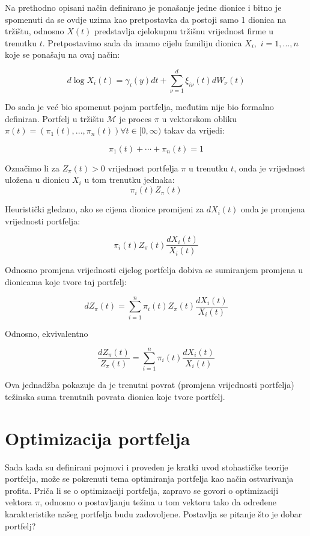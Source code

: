 \documentclass[times, utf8, seminar]{fer}
\begin{document}
Na prethodno opisani način definirano je ponašanje jedne dionice i bitno je spomenuti da se ovdje uzima kao pretpostavka da postoji samo 1 dionica na tržištu, odnosno \(X(t)\) predstavlja cjelokupnu tržišnu vrijednost firme u trenutku $t$.
Pretpostavimo sada da imamo cijelu familiju dionica \(X_i,\) \(i = 1,...,n\) koje  se ponašaju na ovaj način:

\[ d \log X_i(t) = \gamma_i(y)dt + \sum_{\nu=1}^{d}\xi_{i\nu}(t)dW_{\nu}(t) \]

Do sada je već bio spomenut pojam portfelja, međutim nije bio formalno definiran. Portfelj u tržištu $\mathcal{M}$ je proces $\pi$ u vektorskom obliku \( \pi(t) = (\pi_1(t),...,\pi_n(t)) \forall t\in [0,\infty) \) takav da vrijedi:

    \[ \pi_1(t) + \cdots + \pi_n(t) = 1 \]

Označimo li za $Z_{\pi}(t) > 0$ vrijednost portfelja $\pi$ u trenutku $t$, onda je vrijednost uložena u dionicu $X_i$ u tom trenutku jednaka:
    \[ \pi_i(t)Z_{\pi}(t) \]

Heuristički gledano, ako se cijena dionice promijeni za $dX_i(t)$ onda je promjena vrijednosti portfelja:

    \[ \pi_i(t)Z_{\pi}(t)\frac{dX_i(t)}{X_i(t)} \]

Odnosno promjena vrijednosti cijelog portfelja dobiva se sumiranjem promjena u dionicama koje tvore taj portfelj:

    \[ dZ_{\pi}(t) = \sum_{i=1}^{n} \pi_i(t)Z_{\pi}(t)\frac{dX_i(t)}{X_i(t)} \]

Odnosno, ekvivalentno

    \[ \frac{dZ_{\pi}(t)}{Z_{\pi}(t)} = \sum_{i=1}^{n} \pi_i(t)\frac{dX_i(t)}{X_i(t)} \]

Ova jednadžba pokazuje da je trenutni povrat (promjena vrijednosti portfelja) težinska suma trenutnih povrata dionica koje tvore portfelj.

\section{Optimizacija portfelja}
Sada kada su definirani pojmovi i proveden je kratki uvod stohastičke teorije portfelja, može se pokrenuti tema optimiranja portfelja kao način ostvarivanja profita. Priča li se o optimizaciji portfelja, zapravo se govori o optimizaciji vektora $\pi$, odnosno o postavljanju težina u tom vektoru tako da određene karakteristike našeg portfelja budu zadovoljene. Postavlja se pitanje što je dobar portfelj? \\
\end{document}
